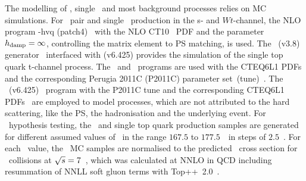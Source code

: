 The modelling of \ttbar, single \tquark\ and most background processes relies on \gls{MC} simulations. 
%
For \tquark\ pair and single \tquark\ production in the s- and $Wt$-channel, the \gls{NLO} program \Powheg-hvq (patch4)~\cite{FRI-0701} with the NLO CT10~\cite{LAI-1001} \gls{PDF} and the parameter $h_{\mathrm{damp}}=\infty$, controlling the matrix element to \gls{PS} matching, is used.
%
The \Acermc\ (v3.8) generator~\cite{SAMPLES-ACER} interfaced with \Pythia (v6.425) provides the simulation of the single top quark t-channel process. 
%
The \Acermc\ and \Pythia\ programs are used with the CTEQ6L1 \glspl{PDF} and the corresponding Perugia 2011C (P2011C) parameter set~(tune)~\cite{Skands}.
%
The \Pythia\ (v6.425)~\cite{SJO-0601} program with the P2011C tune and the corresponding CTEQ6L1 \glspl{PDF}~\cite{Pumplin2002} are employed to model processes, which are not attributed to the hard scattering, like the \gls{PS}, the hadronisation and the underlying event. 
%
For \mt\ hypothesis testing, the \ttbar\ and single top quark production samples are generated for different assumed values of \mt\ in the range $167.5$ to $177.5$~\GeV\ in steps of $2.5$~\GeV.
%
For each \mt\ value, the \ttbar\ MC samples are normalised to the predicted \ttbar\ cross section for \pp\ collisions at ${\sqrt{s}} = 7$~\TeV, which was calculated at \gls{NNLO} in \gls{QCD} including resummation of \gls{NNLL} soft gluon terms with Top++~2.0~\cite{CAC-1101,PRL-109-132001,JHEP-1212,JHEP-1301,Czakon:2013goa,CZA-1101}.
%
%
%

